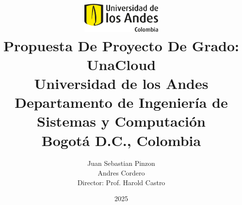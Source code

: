 \title{
    \includegraphics[width=0.3\textwidth]{Documento Final/Imagenes/logo-uniandes(1).png} \\[1cm]
    \textbf{Propuesta De Proyecto De Grado:} \\
    \vspace{0.5cm}
    {\large UnaCloud} \\
    \vspace{1cm}
    {\normalsize Universidad de los Andes} \\
    {\normalsize Departamento de Ingeniería de Sistemas y Computación} \\
    {\normalsize Bogotá D.C., Colombia}
}

\author{
    Juan Sebastian Pinzon \\
    Andres Cordero \\
    \vspace{0.5cm}
    Director: Prof. Harold Castro
}

\date{2025}